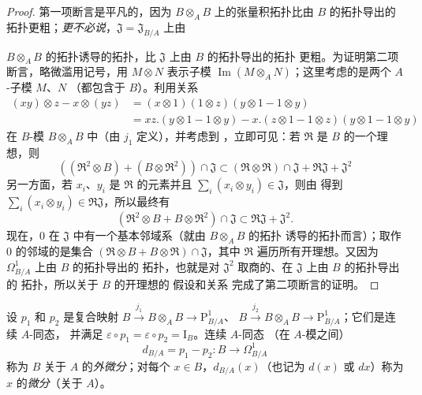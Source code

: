 \begin{proof}
第一项断言是平凡的，因为 $B\otimes_A B$ 上的张量积拓扑比由 $B$ 的拓扑导出的
拓扑更粗；\emph{更不必说}，$\mathfrak{J}=\mathfrak{J}_{B/A}$ 上由

$B\otimes_A B$ 的拓扑诱导的拓扑，比 $\mathfrak{J}$ 上由 $B$ 的拓扑导出的拓扑
更粗。为证明第二项断言，略微滥用记号，用 $M\otimes N$ 表示子模
$\operatorname{Im}(M\otimes_A N)$；这里考虑的是两个 $A$-子模 $M$、$N$
（都包含于 $B$）。利用关系
\[
\begin{aligned}
  (xy)\otimes z-x\otimes(yz)
  &=(x\otimes1)(1\otimes z)(y\otimes1-1\otimes y)\\
  &=xz.(y\otimes1-1\otimes y)
    -x.(z\otimes1-1\otimes z)(y\otimes1-1\otimes y)
\end{aligned}
\]
在 $B$-模 $B\otimes_A B$ 中（由 $j_1$ 定义），并考虑到
，立即可见：若 $\mathfrak{R}$ 是 $B$ 的一个理想，则
\[
  ((\mathfrak{R}^2\otimes B)+(B\otimes\mathfrak{R}^2))\cap\mathfrak{J}
  \subset(\mathfrak{R}\otimes\mathfrak{R})\cap\mathfrak{J}
  +\mathfrak{R}\mathfrak{J}+\mathfrak{J}^2
\]
另一方面，若 $x_i$、$y_i$ 是 $\mathfrak{R}$ 的元素并且
$\sum_i(x_i\otimes y_i)\in\mathfrak{J}$，则由  得到
$\sum_i(x_i\otimes y_i)\in\mathfrak{R}\mathfrak{J}$，所以最终有
\begin{equation}
\tag{20.4.5.1}
\label{0.20.4.5.1-fr}
  (\mathfrak{R}^2\otimes B+B\otimes\mathfrak{R}^2)\cap\mathfrak{J}
  \subset\mathfrak{R}\mathfrak{J}+\mathfrak{J}^2.
\end{equation}
现在，$0$ 在 $\mathfrak{J}$ 中有一个基本邻域系（就由 $B\otimes_A B$ 的拓扑
诱导的拓扑而言）；取作 $0$ 的邻域的是集合
$(\mathfrak{R}\otimes B+B\otimes\mathfrak{R})\cap\mathfrak{J}$，其中
$\mathfrak{R}$ 遍历所有开理想。又因为 $\Omega^1_{B/A}$ 上由 $B$ 的拓扑导出的
拓扑，也就是对 $\mathfrak{J}^2$ 取商的、在 $\mathfrak{J}$ 上由 $B$ 的拓扑导出的
拓扑，所以关于 $B$ 的开理想的
假设和关系  完成了第二项断言的证明。
\end{proof}

\begin{definition}[20.4.6]
\label{0.20.4.6-fr}
设 $p_1$ 和 $p_2$ 是复合映射
$B\xrightarrow{j_1}B\otimes_A B\to\mathrm{P}^1_{B/A}$、
$B\xrightarrow{j_2}B\otimes_A B\to\mathrm{P}^1_{B/A}$；它们是连续 $A$-同态，
并满足 $\varepsilon\circ p_1=\varepsilon\circ p_2=\mathrm{I}_B$。连续 $A$-同态
（在 $A$-模之间）
\begin{equation}
\tag{20.4.6.1}
\label{0.20.4.6.1-fr}
  d_{B/A}=p_1-p_2:B\to\Omega^1_{B/A}
\end{equation}
称为 $B$ 关于 $A$ 的\emph{外微分}；对每个 $x\in B$，$d_{B/A}(x)$（也记为
$d(x)$ 或 $dx$）称为 $x$ 的\emph{微分}（关于 $A$）。
\end{definition}

